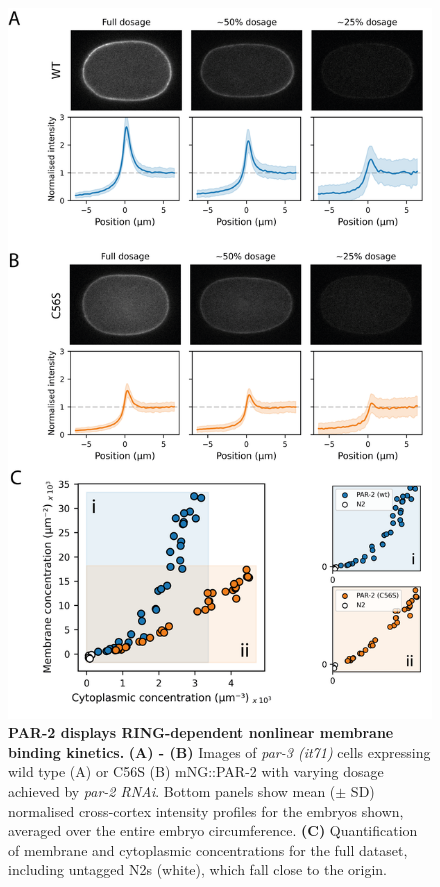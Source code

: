 \documentclass[12pt]{"report"}
\newcommand{\mycaption}[2]{\caption[#1]{\textbf{#1.} #2}}
\begin{document}
\begin{figure}[!h]
\includegraphics[scale=0.88]{rundown_vs_c56s}
\setlength{\abovecaptionskip}{20pt}
\centering
\mycaption{PAR-2 displays RING-dependent nonlinear membrane binding kinetics}{
\textbf{(A) - (B)} Images of \textit{par-3 (it71)} cells expressing wild type (A) or C56S (B) mNG::PAR-2 with varying dosage achieved by \textit{par-2 RNAi}. Bottom panels show mean ($\pm$ SD) normalised cross-cortex intensity profiles for the embryos shown, averaged over the entire embryo circumference.
\textbf{(C)} Quantification of membrane and cytoplasmic concentrations for the full dataset, including untagged N2s (white), which fall close to the origin.
}
\label{fig:rundown_vs_c56s}
\end{figure}
\end{document}
